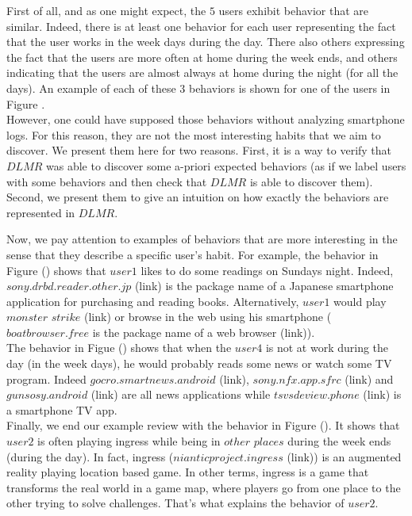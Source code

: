 First of all, and as one might expect, the $5$ users exhibit behavior that are similar. Indeed, there is at least one behavior for each user representing the fact that the user works in the week days during the day. There also others expressing the fact that the users are more often at home during the week ends, and others indicating that the users are almost always at home during the night (for all the days). An example of each of these $3$ behaviors is shown for one of the users in Figure . 
\\However, one could have supposed those behaviors without analyzing smartphone logs. For this reason, they are not the most interesting habits that we aim to discover. We present them here for two reasons. First, it is a way to verify that $DLMR$ was able to discover some a-priori expected behaviors (as if we label users with some behaviors and then check that $DLMR$ is able to discover them). Second, we present them to give an intuition on how exactly the behaviors are represented in $DLMR$. \par

Now, we pay attention to examples of behaviors that are more interesting in the sense that they describe a specific user's habit. For example, the behavior in Figure () shows that $user1$ likes to do some readings on Sundays night. Indeed, $sony.drbd.reader.other.jp$ (link) is the package name of a Japanese smartphone application for purchasing and reading books. Alternatively, $user1$ would play $monster$ $strike$ (link) or browse in the web using his smartphone ($boatbrowser.free$ is the package name of a web browser (link)). 
\\The behavior in Figue () shows that when the $user4$ is not at work during the day (in the week days), he would probably reads some news or watch some TV program. Indeed $gocro.smartnews.android$ (link), $sony.nfx.app.sfrc$ (link) and $gunsosy.android$ (link) are all news applications while $tsvsdeview.phone$ (link) is a smartphone TV app.
\\Finally, we end our example review with the behavior in Figure (). It shows that $user2$ is often playing ingress while being in $other$ $places$ during the week ends (during the day). In fact, ingress ($nianticproject.ingress$ (link)) is an augmented reality playing location based game. In other terms, ingress is a game that transforms the real world in a game map, where players go from one place to the other trying to solve challenges. That's what explains the behavior of $user2$. \par

